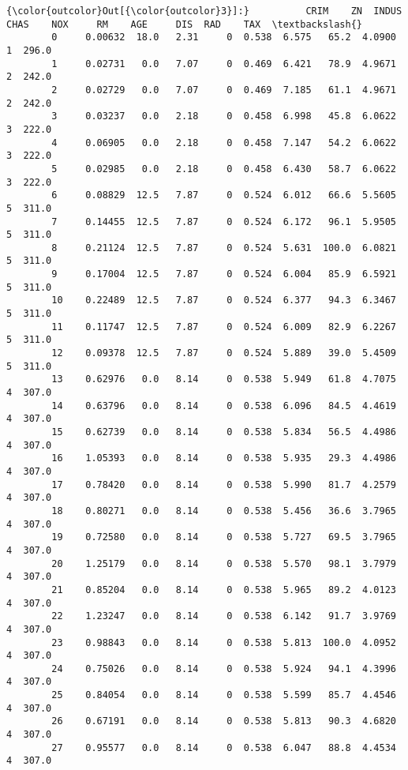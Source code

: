 \documentclass[11pt]{article}
\begin{document}
\begin{Verbatim}[commandchars=\\\{\}]
{\color{outcolor}Out[{\color{outcolor}3}]:}          CRIM    ZN  INDUS  CHAS    NOX     RM    AGE     DIS  RAD    TAX  \textbackslash{}
        0     0.00632  18.0   2.31     0  0.538  6.575   65.2  4.0900    1  296.0   
        1     0.02731   0.0   7.07     0  0.469  6.421   78.9  4.9671    2  242.0   
        2     0.02729   0.0   7.07     0  0.469  7.185   61.1  4.9671    2  242.0   
        3     0.03237   0.0   2.18     0  0.458  6.998   45.8  6.0622    3  222.0   
        4     0.06905   0.0   2.18     0  0.458  7.147   54.2  6.0622    3  222.0   
        5     0.02985   0.0   2.18     0  0.458  6.430   58.7  6.0622    3  222.0   
        6     0.08829  12.5   7.87     0  0.524  6.012   66.6  5.5605    5  311.0   
        7     0.14455  12.5   7.87     0  0.524  6.172   96.1  5.9505    5  311.0   
        8     0.21124  12.5   7.87     0  0.524  5.631  100.0  6.0821    5  311.0   
        9     0.17004  12.5   7.87     0  0.524  6.004   85.9  6.5921    5  311.0   
        10    0.22489  12.5   7.87     0  0.524  6.377   94.3  6.3467    5  311.0   
        11    0.11747  12.5   7.87     0  0.524  6.009   82.9  6.2267    5  311.0   
        12    0.09378  12.5   7.87     0  0.524  5.889   39.0  5.4509    5  311.0   
        13    0.62976   0.0   8.14     0  0.538  5.949   61.8  4.7075    4  307.0   
        14    0.63796   0.0   8.14     0  0.538  6.096   84.5  4.4619    4  307.0   
        15    0.62739   0.0   8.14     0  0.538  5.834   56.5  4.4986    4  307.0   
        16    1.05393   0.0   8.14     0  0.538  5.935   29.3  4.4986    4  307.0   
        17    0.78420   0.0   8.14     0  0.538  5.990   81.7  4.2579    4  307.0   
        18    0.80271   0.0   8.14     0  0.538  5.456   36.6  3.7965    4  307.0   
        19    0.72580   0.0   8.14     0  0.538  5.727   69.5  3.7965    4  307.0   
        20    1.25179   0.0   8.14     0  0.538  5.570   98.1  3.7979    4  307.0   
        21    0.85204   0.0   8.14     0  0.538  5.965   89.2  4.0123    4  307.0   
        22    1.23247   0.0   8.14     0  0.538  6.142   91.7  3.9769    4  307.0   
        23    0.98843   0.0   8.14     0  0.538  5.813  100.0  4.0952    4  307.0   
        24    0.75026   0.0   8.14     0  0.538  5.924   94.1  4.3996    4  307.0   
        25    0.84054   0.0   8.14     0  0.538  5.599   85.7  4.4546    4  307.0   
        26    0.67191   0.0   8.14     0  0.538  5.813   90.3  4.6820    4  307.0   
        27    0.95577   0.0   8.14     0  0.538  6.047   88.8  4.4534    4  307.0   

\end{Verbatim}
\end{document}
